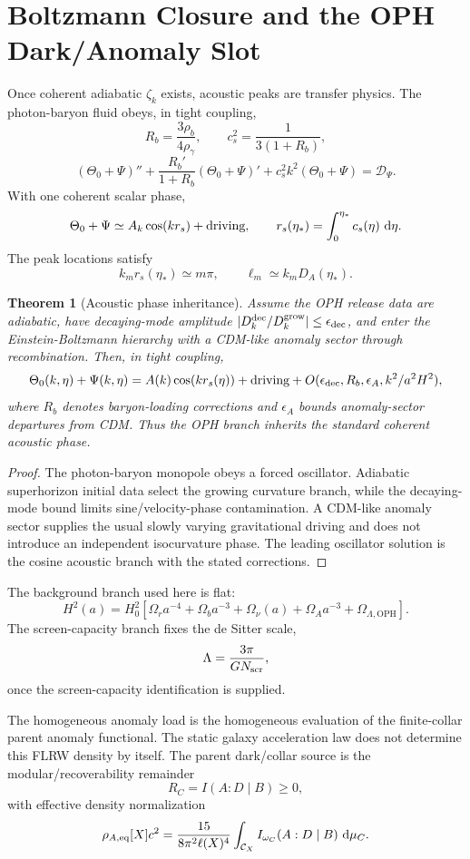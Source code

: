 \documentclass[11pt]{article}
\newtheorem{theorem}{Theorem}[section]
\newcommand{\OPH}{\mathrm{OPH}}
\newcommand{\dd}{\,\mathrm d}
\begin{document}
\section{Boltzmann Closure and the OPH Dark/Anomaly Slot}

Once coherent adiabatic \(\zeta_k\) exists, acoustic peaks are transfer physics. The photon-baryon
fluid obeys, in tight coupling,
\[
R_b=\frac{3\rho_b}{4\rho_\gamma},
\qquad
c_s^2=\frac{1}{3(1+R_b)},
\]
\[
(\Theta_0+\Psi)''
+
\frac{R_b'}{1+R_b}(\Theta_0+\Psi)'
+
c_s^2k^2(\Theta_0+\Psi)
=
\mathcal D_\Psi.
\]
With one coherent scalar phase,
\[
\Theta_0+\Psi\simeq A_k\cos(kr_s)+\hbox{driving},
\qquad
r_s(\eta_\ast)=\int_0^{\eta_\ast}c_s(\eta)\,\dd\eta.
\]
The peak locations satisfy
\[
k_mr_s(\eta_\ast)\simeq m\pi,
\qquad
\ell_m\simeq k_mD_A(\eta_\ast).
\]

\begin{theorem}[Acoustic phase inheritance]\label{thm:acoustic-phase}
Assume the OPH release data are adiabatic, have decaying-mode amplitude
\(|D_k^{\rm dec}/D_k^{\rm grow}|\le\epsilon_{\rm dec}\), and enter the
Einstein-Boltzmann hierarchy with a CDM-like anomaly sector through recombination. Then, in tight
coupling,
\[
\Theta_0(k,\eta)+\Psi(k,\eta)
=
A(k)\cos(k r_s(\eta))
+
\hbox{driving}
+
O(\epsilon_{\rm dec},R_b,\epsilon_A,k^2/a^2H^2),
\]
where \(R_b\) denotes baryon-loading corrections and \(\epsilon_A\) bounds anomaly-sector departures
from CDM. Thus the OPH branch inherits the standard coherent acoustic phase.
\end{theorem}

\begin{proof}
The photon-baryon monopole obeys a forced oscillator. Adiabatic superhorizon initial data select the
growing curvature branch, while the decaying-mode bound limits sine/velocity-phase contamination.
A CDM-like anomaly sector supplies the usual slowly varying gravitational driving and does not
introduce an independent isocurvature phase. The leading oscillator solution is the cosine
acoustic branch with the stated corrections.
\end{proof}

The background branch used here is flat:
\[
H^2(a)=
H_0^2
\left[
\Omega_r a^{-4}
+\Omega_b a^{-3}
+\Omega_\nu(a)
+\Omega_A a^{-3}
+\Omega_{\Lambda,\OPH}
\right].
\]
The screen-capacity branch fixes the de Sitter scale,
\[
\Lambda=\frac{3\pi}{G N_{\rm scr}},
\]
once the screen-capacity identification is supplied.

The homogeneous anomaly load is the homogeneous evaluation of the finite-collar parent anomaly
functional. The static galaxy acceleration law does not determine this FLRW density by itself.
The parent dark/collar source is the modular/recoverability remainder
\[
R_C=I(A:D\mid B)\ge0,
\]
with effective density normalization
\[
\rho_{A,\rm eq}[X]c^2
=
\frac{15}{8\pi^2\ell(X)^4}
\int_{\mathcal C_X}
I_{\omega_C}(A:D\mid B)\,\dd\mu_C.
\]
\end{document}

